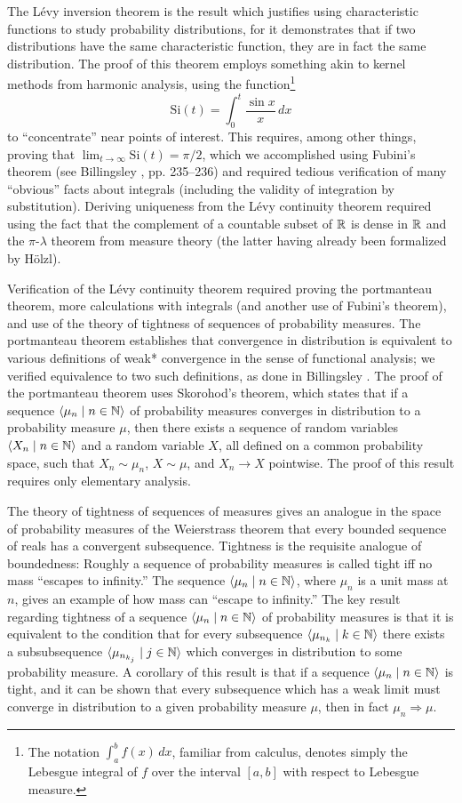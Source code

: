 \documentclass[leqno]{article}
\theoremstyle{definition}
\newcommand{\bldseq}[2]{\langle{#1}\mid{#2}\rangle}
\newcommand\Si{\text{Si}}
\begin{document}
The L\'evy inversion theorem is the result which justifies using characteristic functions to study probability distributions, for it demonstrates that if two distributions have the same characteristic function, they are in fact the same distribution. The proof of this theorem employs something akin to kernel methods from harmonic analysis, using the function\footnote{The notation $\int_a^b f(x) \, dx$, familiar from calculus, denotes simply the Lebesgue integral of $f$ over the interval $[a,b]$ with respect to Lebesgue measure.}
\[ \Si(t) = \int_0^t \frac{\sin x}{x} \, dx \]
to ``concentrate'' near points of interest. This requires, among other things, proving that $\lim_{t \rightarrow \infty} \Si(t) = \pi/2$, which we accomplished using Fubini's theorem (see Billingsley \cite{billingsley}, pp. 235--236) and required tedious verification of many ``obvious'' facts about integrals (including the validity of integration by substitution). Deriving uniqueness from the L\'evy continuity theorem required using the fact that the complement of a countable subset of $\mathbb{R}$ is dense in $\mathbb{R}$ and the $\pi$-$\lambda$ theorem from measure theory (the latter having already been formalized by H\"olzl).

Verification of the L\'evy continuity theorem required proving the portmanteau theorem, more calculations with integrals (and another use of Fubini's theorem), and use of the theory of tightness of sequences of probability measures. The portmanteau theorem establishes that convergence in distribution is equivalent to various definitions of weak* convergence in the sense of functional analysis; we verified equivalence to two such definitions, as done in Billingsley \cite{billingsley}. The proof of the portmanteau theorem uses Skorohod's theorem, which states that if a sequence $\bldseq{\mu_n}{n \in \N}$ of probability measures converges in distribution to a probability measure $\mu$, then there exists a sequence of random variables $\bldseq{X_n}{n \in \N}$ and a random variable $X$, all defined on a common probability space, such that $X_n \sim \mu_n$, $X \sim \mu$, and $X_n \rightarrow X$ pointwise. The proof of this result requires only elementary analysis.

The theory of tightness of sequences of measures gives an analogue in the space of probability measures of the Weierstrass theorem that every bounded sequence of reals has a convergent subsequence. Tightness is the requisite analogue of boundedness: Roughly a sequence of probability measures is called tight iff no mass ``escapes to infinity.'' The sequence $\bldseq{\mu_n}{n \in \N}$, where $\mu_n$ is a unit mass at $n$, gives an example of how mass can ``escape to infinity.'' The key result regarding tightness of a sequence $\bldseq{\mu_n}{n \in \N}$ of probability measures is that it is equivalent to the condition that for every subsequence $\bldseq{\mu_{n_k}}{k \in \N}$ there exists a subsubsequence $\bldseq{\mu_{n_{k_j}}}{j \in \N}$ which converges in distribution to some probability measure. A corollary of this result is that if a sequence $\bldseq{\mu_n}{n \in \N}$ is tight, and it can be shown that every subsequence which has a weak limit must converge in distribution to a given probability measure $\mu$, then in fact $\mu_n \Rightarrow \mu$.
\end{document}
